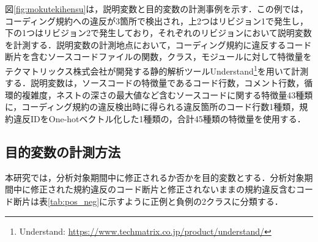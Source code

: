 \documentclass[T,J]{fose} %
\begin{document}
図\ref{fig:mokutekihensu}は，説明変数と目的変数の計測事例を示す．この例では，コーディング規約への違反が3箇所で検出され，上2つはリビジョン1で発生し，下の1つはリビジョン2で発生しており，それぞれのリビジョンにおいて説明変数を計測する．説明変数の計測地点において，コーディング規約に違反するコード断片を含むソースコードファイルの関数，クラス，モジュールに対して特徴量をテクマトリックス株式会社が開発する静的解析ツールUnderstand\footnote{Understand: \url{https://www.techmatrix.co.jp/product/understand/}}を用いて計測する．説明変数は，ソースコードの特徴量であるコード行数，コメント行数，循環的複雑度，ネストの深さの最大値など含むソースコードに関する特徴量43種類に，コーディング規約の違反検出時に得られる違反箇所のコード行数1種類，規約違反IDをOne-hotベクトル化した1種類の，合計45種類の特徴量を使用する．

\subsection{目的変数の計測方法}

本研究では，分析対象期間中に修正されるか否かを目的変数とする．分析対象期間中に修正された規約違反のコード断片と修正されないままの規約違反含むコード断片は表\ref{tab:pos_neg}に示すように正例と負例の2クラスに分類する．

\begin{table}[t]
    \centering
    \caption{正例と負例の分類}
    \label{tab:pos_neg}
\end{table}
\end{document}
